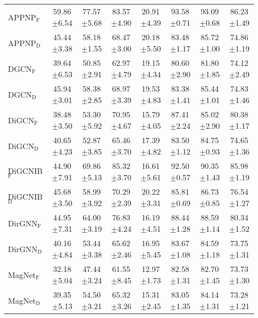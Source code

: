 \begin{table}[h]
{\begin{tabular}{lccccccc}
        APPNP$_{\text{F}}$& 59.86$\pm$6.54 & 77.57$\pm$5.68 & 83.57$\pm$4.90 & 20.91$\pm$4.39 & 93.58$\pm$0.71 & 93.09$\pm$0.68 & 86.23$\pm$1.49  \\
        APPNP$_{\text{D}}$ & 45.44$\pm$3.38 & 58.18$\pm$1.55 & 68.47$\pm$3.00 & 20.18$\pm$5.50 & 83.48$\pm$1.17 & 85.72$\pm$1.00 & 74.86$\pm$1.19 \\ \midrule

        
        DGCN$_{\text{F}}$ & 39.64$\pm$6.53 & 50.85$\pm$2.91 & 62.97$\pm$4.79 & 19.15$\pm$4.34 & 80.60$\pm$2.90 & 81.80$\pm$1.85 & 74.12$\pm$2.49  \\
        DGCN$_{\text{D}}$ & 45.94$\pm$3.01 & 58.38$\pm$2.85 & 68.97$\pm$3.39 & 19.53$\pm$4.83 & 83.38$\pm$1.41 & 85.44$\pm$1.01 & 74.83$\pm$1.46  \\ \midrule

        DiGCN$_{\text{F}}$ & 38.48$\pm$3.50 & 53.30$\pm$5.92 & 70.95$\pm$4.67 & 15.79$\pm$4.05 & 87.41$\pm$2.24 & 85.02$\pm$2.90 & 80.38$\pm$1.17 \\
        DiGCN$_{\text{D}}$ & 40.65$\pm$4.23 & 52.87$\pm$3.85 & 65.46$\pm$3.70 & 17.39$\pm$4.82 & 83.50$\pm$1.12 & 84.75$\pm$0.93 & 74.65$\pm$1.36  \\ \midrule

        
        DiGCNIB$_{\text{F}}$& 44.90$\pm$7.91 & 69.86$\pm$5.13 & 85.32$\pm$3.70 & 16.61$\pm$5.61 & 92.50$\pm$0.57 & 90.35$\pm$1.43 & 85.98$\pm$1.19 \\
        DiGCNIB$_{\text{D}}$ & 45.68$\pm$3.50 & 58.99$\pm$3.92 & 70.29$\pm$2.39 & 20.22$\pm$3.31 & 85.81$\pm$0.69 & 86.73$\pm$0.85 & 76.54$\pm$1.27 \\ \midrule

        DirGNN$_{\text{F}}$ & 44.95$\pm$7.31 & 64.00$\pm$3.19 & 76.83$\pm$4.24 & 16.19$\pm$4.51 & 88.44$\pm$1.28 & 88.59$\pm$1.14 & 80.34$\pm$1.52 \\
        DirGNN$_{\text{D}}$ & 40.16$\pm$4.84 & 53.44$\pm$3.38 & 65.62$\pm$2.46 & 16.95$\pm$5.45 & 83.67$\pm$1.08 & 84.59$\pm$1.18 & 73.75$\pm$1.31 \\ \midrule
        
        MagNet$_{\text{F}}$ & 32.18$\pm$5.04 & 47.44$\pm$3.24 & 61.55$\pm$8.45 & 12.97$\pm$1.73 & 82.58$\pm$1.31 & 82.70$\pm$1.45 & 73.73$\pm$1.30 \\
        MagNet$_{\text{D}}$ & 39.35$\pm$5.13 & 54.50$\pm$3.21 & 65.32$\pm$3.26 & 15.31$\pm$2.45 & 83.05$\pm$1.35 & 84.14$\pm$1.31 & 73.28$\pm$1.21  \\ \midrule


\end{tabular}}
\end{table}
